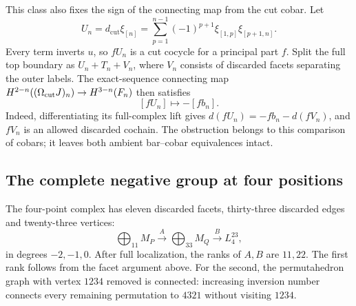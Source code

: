 This class also fixes the sign of the connecting map from the cut
cobar. Let
\[
 U_n=d_{\mathrm{cut}}\xi_{[n]}
       =\sum_{p=1}^{n-1}(-1)^{p+1}\xi_{[1,p]}\xi_{[p+1,n]}.
\]
Every term inverts $u$, so $fU_n$ is a cut cocycle for a principal
part $f$. Split the full top boundary as $U_n+T_n+V_n$, where
$V_n$ consists of discarded facets separating the outer labels.
The exact-sequence connecting map
$H^{2-n}((\Omega_{\mathrm{cut}} J)_n)\to H^{3-n}(F_n)$ then satisfies
\begin{equation}\label{cycuts:eq:connecting}
 [fU_n]\longmapsto-[fb_n].
\end{equation}
Indeed, differentiating its full-complex lift gives
$d(fU_n)=-fb_n-d(fV_n)$, and $fV_n$ is an allowed discarded
cochain. The obstruction belongs to this comparison of cobars;
it leaves both ambient bar--cobar equivalences intact.

\subsection{The complete negative group at four positions}

The four-point complex has eleven discarded facets, thirty-three
discarded edges and twenty-three vertices:
\begin{equation}\label{cycuts:eq:F4}
 \bigoplus_{11}M_P\xrightarrow{A}\bigoplus_{33}M_Q
                      \xrightarrow{B}L_4^{23},
\end{equation}
in degrees $-2,-1,0$. After full localization, the ranks of $A,B$
are $11,22$. The first rank follows from the facet argument above.
For the second, the permutahedron graph with vertex $1234$ removed
is connected: increasing inversion number connects every remaining
permutation to $4321$ without visiting $1234$.

